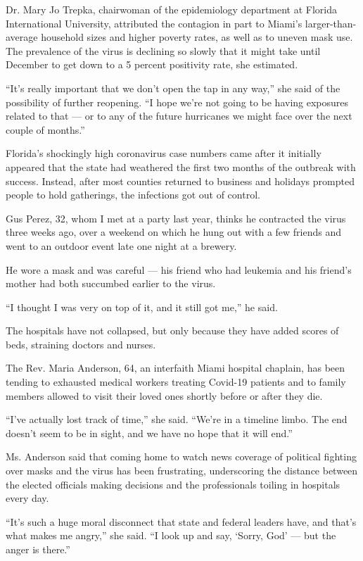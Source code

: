 Dr. Mary Jo Trepka, chairwoman of the epidemiology department at Florida
International University, attributed the contagion in part to Miami's
larger-than-average household sizes and higher poverty rates, as well as
to uneven mask use. The prevalence of the virus is declining so slowly
that it might take until December to get down to a 5 percent positivity
rate, she estimated.

``It's really important that we don't open the tap in any way,'' she
said of the possibility of further reopening. ``I hope we're not going
to be having exposures related to that --- or to any of the future
hurricanes we might face over the next couple of months.''

Florida's shockingly high coronavirus case numbers came after it
initially appeared that the state had weathered the first two months of
the outbreak with success. Instead, after most counties returned to
business and holidays prompted people to hold gatherings, the infections
got out of control.

Gus Perez, 32, whom I met at a party last year, thinks he contracted the
virus three weeks ago, over a weekend on which he hung out with a few
friends and went to an outdoor event late one night at a brewery.

He wore a mask and was careful --- his friend who had leukemia and his
friend's mother had both succumbed earlier to the virus.

``I thought I was very on top of it, and it still got me,'' he said.

The hospitals have not collapsed, but only because they have added
scores of beds, straining doctors and nurses.

The Rev. Maria Anderson, 64, an interfaith Miami hospital chaplain, has
been tending to exhausted medical workers treating Covid-19 patients and
to family members allowed to visit their loved ones shortly before or
after they die.

``I've actually lost track of time,'' she said. ``We're in a timeline
limbo. The end doesn't seem to be in sight, and we have no hope that it
will end.''

Ms. Anderson said that coming home to watch news coverage of political
fighting over masks and the virus has been frustrating, underscoring the
distance between the elected officials making decisions and the
professionals toiling in hospitals every day.

``It's such a huge moral disconnect that state and federal leaders have,
and that's what makes me angry,'' she said. ``I look up and say, `Sorry,
God' --- but the anger is there.''

